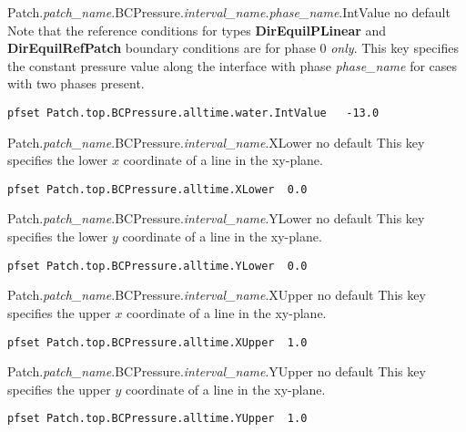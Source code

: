 {Patch.{\em patch\_name}.BCPressure.{\em interval\_name}.{\em phase\_name}.IntValue}
{no default}
{Note that the reference conditions for types {\bf DirEquilPLinear} and
{\bf DirEquilRefPatch}
boundary conditions are for phase 0 {\em only}.
This key specifies the constant pressure value
along the interface with phase {\em phase\_name} for cases with two phases
present.
}
\begin{display}\begin{verbatim}
pfset Patch.top.BCPressure.alltime.water.IntValue   -13.0
\end{verbatim}\end{display}

{Patch.{\em patch\_name}.BCPressure.{\em interval\_name}.XLower}
{no default}
{This key specifies the lower $x$ coordinate of a line in the xy-plane.
}
\begin{display}\begin{verbatim}
pfset Patch.top.BCPressure.alltime.XLower  0.0
\end{verbatim}\end{display}

{Patch.{\em patch\_name}.BCPressure.{\em interval\_name}.YLower}
{no default}
{This key specifies the lower $y$ coordinate of a line in the xy-plane.
}
\begin{display}\begin{verbatim}
pfset Patch.top.BCPressure.alltime.YLower  0.0
\end{verbatim}\end{display}

{Patch.{\em patch\_name}.BCPressure.{\em interval\_name}.XUpper}
{no default}
{This key specifies the upper $x$ coordinate of a line in the xy-plane.
}
\begin{display}\begin{verbatim}
pfset Patch.top.BCPressure.alltime.XUpper  1.0
\end{verbatim}\end{display}

{Patch.{\em patch\_name}.BCPressure.{\em interval\_name}.YUpper}
{no default}
{This key specifies the upper $y$ coordinate of a line in the xy-plane.
}
\begin{display}\begin{verbatim}
pfset Patch.top.BCPressure.alltime.YUpper  1.0
\end{verbatim}\end{display}

